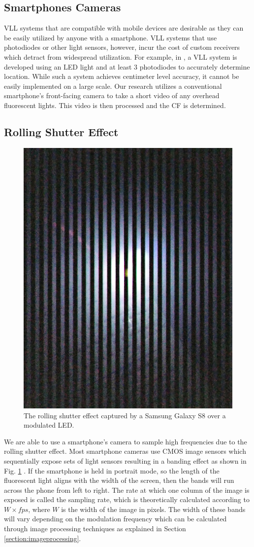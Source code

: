 \documentclass[conference]{IEEEtran}
\begin{document}
\subsection{Smartphones Cameras}

VLL systems that are compatible with mobile devices are desirable as they can be easily utilized by anyone with a smartphone. VLL systems that use photodiodes or other light sensors, however, incur the cost of custom receivers which  detract from widespread utilization. For example, in \cite{xu2016indoor}, a VLL system is developed using an LED light and at least 3 photodiodes to accurately determine location. While such a system achieves centimeter level accuracy, it cannot be easily implemented on a large scale. Our research utilizes a conventional smartphone's front-facing camera to take a short video of any overhead fluorescent lights. This video is then processed and the CF is determined.

\subsection{Rolling Shutter Effect}

\begin{figure}[!ht]
\centerline{\includegraphics[width=0.5\columnwidth]{figures/rolling_shutter.jpg}}
	\caption{The rolling shutter effect captured by a Samsung Galaxy S8 over a modulated LED.}
	\label{fig:rollingshutter}
\end{figure}

We are able to use a smartphone's camera to sample high frequencies due to the rolling shutter effect. Most smartphone cameras use CMOS image sensors which sequentially expose sets of light sensors resulting in a banding effect as shown in Fig. \ref{fig:rollingshutter} \cite{liang2008analysis}. If the smartphone is held in portrait mode, so the length of the fluorescent light aligns with the width of the screen, then the bands will run across the phone from left to right. The rate at which one column of the image is exposed is called the sampling rate, which is theoretically calculated according to $W \times fps$, where $W$ is the width of the image in pixels. The width of these bands will vary depending on the modulation frequency which can be calculated through image processing techniques as explained in Section \ref{section:imageprocessing}.
\end{document}
